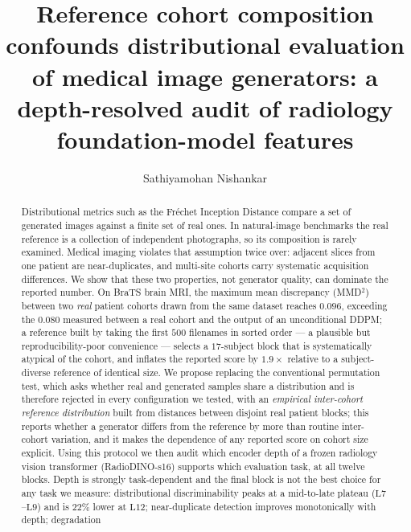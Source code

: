\documentclass[preprint,12pt,authoryear]{elsarticle}
\newcommand{\Lb}[1]{\ensuremath{\mathrm{L}#1}}
\begin{document}
\begin{frontmatter}

\title{Reference cohort composition confounds distributional evaluation of
       medical image generators: a depth-resolved audit of radiology
       foundation-model features}

\author[pdn]{Sathiyamohan Nishankar}
\address[pdn]{Department of Computer Engineering, University of Peradeniya,
              Peradeniya, Sri Lanka}

\begin{abstract}
Distributional metrics such as the Fr\'echet Inception Distance compare a set of
generated images against a finite set of real ones. In natural-image benchmarks
the real reference is a collection of independent photographs, so its
composition is rarely examined. Medical imaging violates that assumption twice
over: adjacent slices from one patient are near-duplicates, and multi-site
cohorts carry systematic acquisition differences. We show that these two
properties, not generator quality, can dominate the reported number. On BraTS
brain MRI, the maximum mean discrepancy (MMD$^2$) between two \emph{real}
patient cohorts drawn from the same dataset reaches $0.096$, exceeding the
$0.080$ measured between a real cohort and the output of an unconditional DDPM;
a reference built by taking the first $500$ filenames in sorted order --- a
plausible but reproducibility-poor convenience --- selects a $17$-subject
block that is systematically atypical of the cohort, and inflates the reported score by $1.9\times$ relative
to a subject-diverse reference of identical size. We propose replacing the conventional permutation
test, which asks whether real and generated samples share a distribution and
is therefore rejected in every configuration we tested, with an \emph{empirical inter-cohort reference distribution} built from
distances between disjoint real patient blocks; this reports whether a
generator differs from the reference by more than routine inter-cohort
variation, and it makes the dependence of any reported score on cohort size
explicit. Using this protocol we then audit which encoder depth of a frozen
radiology vision transformer (RadioDINO-s16) supports which evaluation task, at
all twelve blocks. Depth is strongly task-dependent and the final block is not
the best choice for any task we measure: distributional discriminability peaks
at a mid-to-late plateau (\Lb{7}--\Lb{9}) and is $22\%$ lower at \Lb{12};
near-duplicate detection improves monotonically with depth; degradation

\end{abstract}
\end{frontmatter}
\end{document}
